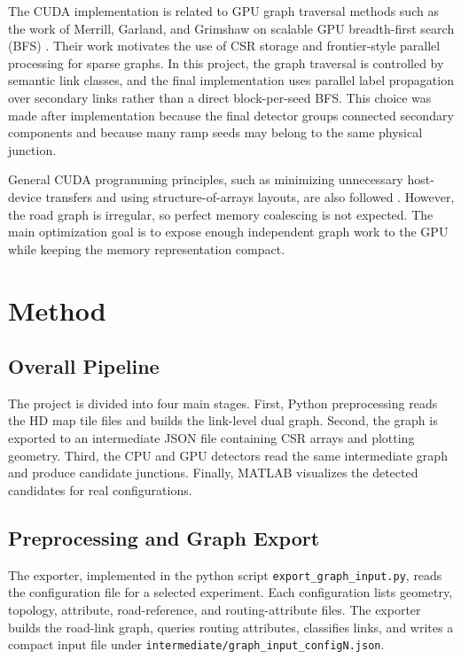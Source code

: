 \documentclass[conference]{IEEEtran}
\begin{document}
The CUDA implementation is related to GPU graph traversal methods such as the work of Merrill, Garland, and Grimshaw on scalable GPU breadth-first search (BFS) \cite{merrill2011}. Their work motivates the use of CSR storage and frontier-style parallel processing for sparse graphs. In this project, the graph traversal is controlled by semantic link classes, and the final implementation uses parallel label propagation over secondary links rather than a direct block-per-seed BFS. This choice was made after implementation because the final detector groups connected secondary components and because many ramp seeds may belong to the same physical junction.

General CUDA programming principles, such as minimizing unnecessary host-device transfers and using structure-of-arrays layouts, are also followed \cite{cuda}. However, the road graph is irregular, so perfect memory coalescing is not expected. The main optimization goal is to expose enough independent graph work to the GPU while keeping the memory representation compact.

\section{Method}

\subsection{Overall Pipeline}

The project is divided into four main stages. First, Python preprocessing reads the HD map tile files and builds the link-level dual graph. Second, the graph is exported to an intermediate JSON file containing CSR arrays and plotting geometry. Third, the CPU and GPU detectors read the same intermediate graph and produce candidate junctions. Finally, MATLAB visualizes the detected candidates for real configurations.

\subsection{Preprocessing and Graph Export}

The exporter, implemented in the python script \texttt{export\_graph\_input.py}, reads the configuration file for a selected experiment. Each configuration lists geometry, topology, attribute, road-reference, and routing-attribute files. The exporter builds the road-link graph, queries routing attributes, classifies links, and writes a compact input file under \texttt{intermediate/graph\_input\_configN.json}.
\end{document}
